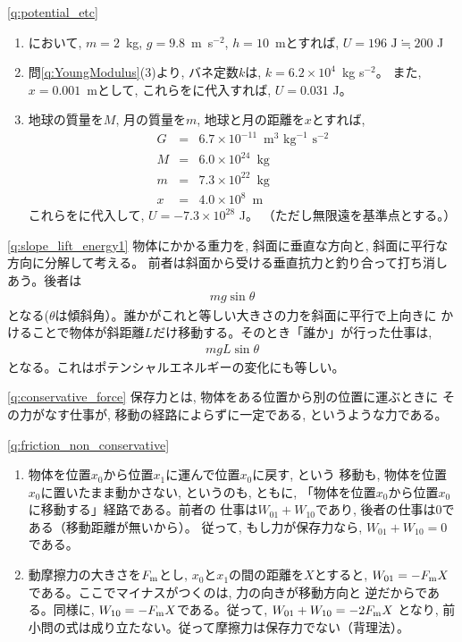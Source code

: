 \ref{q:potential_etc}
\begin{enumerate}
\item {}において, $m=2$~kg, $g=9.8$~m~s$^{-2}$, $h=10$~mとすれば, 
$U=196\,\,\text{J}\fallingdotseq 200$ J
\item 問\ref{q:YoungModulus}(3)より, バネ定数$k$は, $k=6.2\times10^4$~kg s$^{-2}$。
また, $x=0.001$~mとして, これらをに代入すれば, $U=0.031$ J。
\item 地球の質量を$M$, 月の質量を$m$, 地球と月の距離を$x$とすれば, 
\begin{eqnarray*}
G&=&6.7\times10^{-11}\,\text{ m}^3\,\,\text{kg}^{-1}\,\,\text{s}^{-2}\\
M&=&6.0\times10^{24}\,\text{ kg}\\
m&=&7.3\times10^{22}\,\text{ kg}\\
x&=&4.0\times10^{8}\,\text{ m}
\end{eqnarray*}
これらをに代入して, $U=-7.3\times10^{28}$ J。
（ただし無限遠を基準点とする。）
\end{enumerate}
\mv

\ref{q:slope_lift_energy1}
物体にかかる重力を, 斜面に垂直な方向と, 斜面に平行な方向に分解して考える。
前者は斜面から受ける垂直抗力と釣り合って打ち消しあう。後者は
\begin{eqnarray}mg\sin\theta\end{eqnarray}
となる($\theta$は傾斜角）。誰かがこれと等しい大きさの力を斜面に平行で上向きに
かけることで物体が斜距離$L$だけ移動する。そのとき「誰か」が行った仕事は, 
\begin{eqnarray}mgL\sin\theta\end{eqnarray}
となる。これはポテンシャルエネルギーの変化にも等しい。\mv


\ref{q:conservative_force}
保存力とは, 物体をある位置から別の位置に運ぶときに
その力がなす仕事が, 移動の経路によらずに一定である, というような力である。\mv


\ref{q:friction_non_conservative}
\begin{enumerate}
\item 物体を位置$x_0$から位置$x_1$に運んで位置$x_0$に戻す, という
移動も, 物体を位置$x_0$に置いたまま動かさない, というのも, ともに, 
「物体を位置$x_0$から位置$x_0$に移動する」経路である。前者の
仕事は$W_{01}+W_{10}$であり, 後者の仕事は0である（移動距離が無いから）。
従って, もし力が保存力なら, $W_{01}+W_{10}=0$である。
\item 動摩擦力の大きさを$F_{\text m}$とし, $x_0$と$x_1$の間の距離を$X$とすると, 
$W_{01}=-F_{\text m}X$である。ここでマイナスがつくのは, 力の向きが移動方向と
逆だからである。同様に, $W_{10}=-F_{\text m}X$である。従って, 
$W_{01}+W_{10}=-2F_{\text m}X$
となり, 前小問の式は成り立たない。従って摩擦力は保存力でない（背理法）。
\end{enumerate}
\mv

